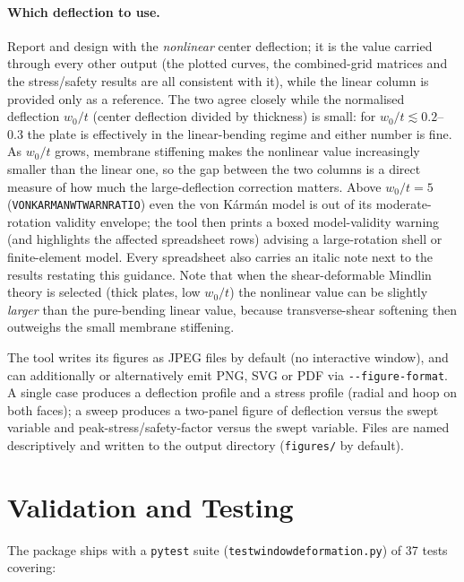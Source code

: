 \documentclass[11pt]{article}
\newcommand{\codeus}{\textunderscore\allowbreak}
\DeclareRobustCommand{\code}[1]{\texttt{\ifmmode\else\renewcommand{\_}{\codeus}\fi#1}}
\begin{document}
\paragraph{Which deflection to use.} Report and design with the \emph{nonlinear}
center deflection; it is the value carried through every other output (the plotted
curves, the combined-grid matrices and the stress/safety results are all consistent
with it), while the linear column is provided only as a reference. The two agree
closely while the normalised deflection $w_{0}/t$ (center deflection divided by
thickness) is small: for $w_{0}/t \lesssim 0.2$--$0.3$ the plate is effectively in
the linear-bending regime and either number is fine. As $w_{0}/t$ grows, membrane
stiffening makes the nonlinear value increasingly smaller than the linear one, so
the gap between the two columns is a direct measure of how much the large-deflection
correction matters. Above $w_{0}/t = \num{5}$ (\code{VON\_KARMAN\_WT\_WARN\_RATIO})
even the von K\'arm\'an model is out of its moderate-rotation validity envelope; the
tool then prints a boxed model-validity warning (and highlights the affected
spreadsheet rows) advising a large-rotation shell or finite-element model. Every
spreadsheet also carries an italic note next to the results restating this guidance.
Note that when the shear-deformable Mindlin theory is selected (thick plates, low
$w_{0}/t$) the nonlinear value can be slightly \emph{larger} than the pure-bending
linear value, because transverse-shear softening then outweighs the small membrane
stiffening.

The tool writes its figures as JPEG files by default (no interactive window), and
can additionally or alternatively emit PNG, SVG or PDF via \code{-{}-figure-format}.
A single case produces a deflection profile and a stress profile (radial and hoop
on both faces); a sweep produces a two-panel figure of deflection versus the swept
variable and peak-stress/safety-factor versus the swept variable. Files are named
descriptively and written to the output directory (\code{figures/} by default).

\section{Validation and Testing}

The package ships with a \code{pytest} suite (\code{test\_window\_deformation.py})
of 37 tests covering:
\end{document}
